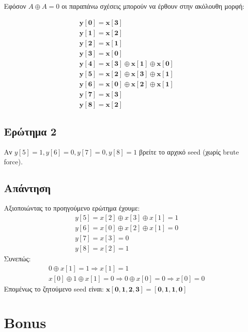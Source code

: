 \documentclass[12pt]{article}
\begin{document}
Εφόσον \( A \oplus A = 0 \) οι παραπάνω σχέσεις μπορούν να έρθουν στην ακόλουθη μορφή:

\begin{equation*}
\begin{array}{c}
     
\mathbf{y[0] = x[3]} \\
\mathbf{y[1] = x[2]} \\
\mathbf{y[2] = x[1]} \\
\mathbf{y[3] = x[0]} \\
\mathbf{y[4] = x[3] \oplus x[1] \oplus x[0]} \\
\mathbf{y[5] = x[2]  \oplus x[3] \oplus x[1]} \\
\mathbf{y[6] = x[0] \oplus x[2]  \oplus x[1]} \\
\mathbf{y[7] = x[3] }   \\
\mathbf{y[8] = x[2]}    
\end{array}            
\end{equation*}
\hfill \blacksquare
\subsection*{Ερώτημα 2}
Αν \( y[5]=1, y[6]=0, y[7]=0, y[8]=1 \) βρείτε το αρχικό seed (χωρίς brute force).
\subsection*{Απάντηση}
Αξιοποιώντας το προηγούμενο ερώτημα έχουμε:
\begin{equation*}
\begin{array}{c}
y[5] = x[2]  \oplus x[3] \oplus x[1] = 1 \\
y[6] = x[0] \oplus x[2]  \oplus x[1] = 0 \\
y[7] = x[3] = 0 \\
y[8] = x[2] = 1
\end{array}
\end{equation*}
Συνεπώς:
\begin{equation*}
\begin{array}{c}
0 \oplus x[1] = 1 \Rightarrow x[1] = 1 \\
x[0] \oplus 1  \oplus x[1] = 0 \Rightarrow 0\oplus x[0] = 0 \Rightarrow x[0] = 0
\end{array}
\end{equation*}
Επομένως το ζητούμενο seed είναι: \( \mathbf{x[0, 1, 2, 3] = [0, 1, 1, 0]} \)
\hfill \blacksquare
\section*{Bonus}
\end{document}
